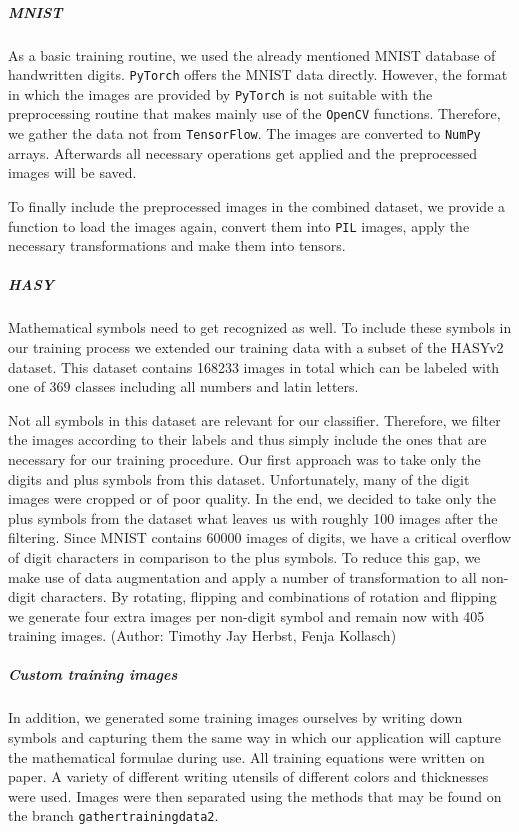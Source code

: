 \documentclass[12pt]{article}
\begin{document}
		\subparagraph{MNIST}
			As a basic training routine, we used the already mentioned MNIST database of handwritten digits. \texttt{PyTorch} offers the MNIST data directly. However, the format in which the images are provided by \texttt{PyTorch} is not suitable with the preprocessing routine that makes mainly use of the \texttt{OpenCV} functions. Therefore, we gather the data not from \texttt{TensorFlow}. The images are converted to \texttt{NumPy} arrays. Afterwards all necessary operations get applied and the preprocessed images will be saved. 
			
			To finally include the preprocessed images in the combined dataset, we provide a function to load the images again, convert them into \texttt{PIL} images, apply the necessary transformations and make them into tensors.
			
		\subparagraph{HASY}
			Mathematical symbols need to get recognized as well. To include these symbols in our training process we extended our training data with a subset of the HASYv2\cite{hasy} dataset. This dataset contains 168233 images in total which can be labeled with one of 369 classes including all numbers and latin letters. 
			
			Not all symbols in this dataset are relevant for our classifier. Therefore, we filter the images according to their labels and thus simply include the ones that are necessary for our training procedure. Our first approach was to take only the digits and plus symbols from this dataset. Unfortunately, many of the digit images were cropped or of poor quality. In the end, we decided to take only the plus symbols from the dataset what leaves us with roughly 100 images after the filtering. Since MNIST contains 60000 images of digits, we have a critical overflow of digit characters in comparison to the plus symbols. To reduce this gap, we make use of data augmentation and apply a number of transformation to all non-digit characters. By rotating, flipping and combinations of rotation and flipping we generate four extra images per non-digit symbol and remain now with 405 training images.
			\newline			\newline
			\indent\small{(Author: Timothy Jay Herbst, Fenja Kollasch)}
			\vspace{-0.5 cm}
		\subparagraph{Custom training images}	
		In addition, we generated some training images ourselves by writing down symbols and capturing them the same way in which our application will capture the mathematical formulae during use.
		All training equations were written on paper.
		A variety of different writing utensils of different colors and thicknesses were used.
		Images were then separated using the methods that may be found on the branch \texttt{gathertrainingdata2}. %
		
\end{document}
